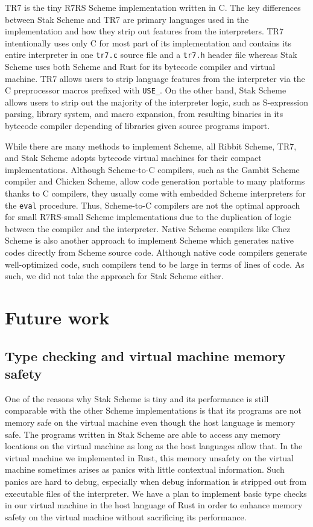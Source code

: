 \documentclass[sigplan, anonymous, review]{acmart}
\begin{document}
TR7 \cite{tr7} is the tiny R7RS Scheme implementation written in C.
The key differences between Stak Scheme and TR7 are primary languages used in
the implementation and how they strip out features from the
interpreters.
TR7 intentionally uses only C for most part of its implementation and
contains its entire interpreter in one \texttt{tr7.c} source file and a
\texttt{tr7.h} header file whereas Stak Scheme uses both Scheme and
Rust for its bytecode compiler and virtual machine.
TR7 allows users to strip language features from the interpreter via
the C preprocessor macros prefixed with \texttt{USE\_}.
On the other hand, Stak Scheme allows users to strip out the majority of
the interpreter logic, such as S-expression parsing, library system, and
macro expansion, from resulting binaries in its bytecode compiler
depending of libraries given source programs import.

While there are many methods to implement Scheme, all Ribbit Scheme,
TR7, and Stak Scheme adopts bytecode virtual machines for their
compact implementations.
Although Scheme-to-C compilers, such as the Gambit Scheme compiler and
Chicken Scheme, allow code generation portable to many platforms
thanks to C compilers, they usually come with embedded Scheme
interpreters for the \texttt{eval} procedure.
Thus, Scheme-to-C compilers are not the optimal approach for small
R7RS-small Scheme implementations due to the duplication of logic between the
compiler and the interpreter.
Native Scheme compilers like Chez Scheme is also another approach to
implement Scheme which generates native codes directly from Scheme source code.
Although native code compilers generate well-optimized code, such
compilers tend to be large in terms of lines of code.
As such, we did not take the approach for Stak Scheme either.

\section{Future work}

\subsection{Type checking and virtual machine memory safety}

One of the reasons why Stak Scheme is tiny and its performance is still
comparable with the other Scheme implementations is that its
programs are not memory safe on the virtual machine even though
the host language is memory safe.
The programs written in Stak Scheme are able to access any memory
locations on the virtual machine as long as the host languages allow that.
In the virtual machine we implemented in Rust, this memory
unsafety on the virtual machine sometimes arises as panics with little
contextual information.
Such panics are hard to debug, especially when debug information is
stripped out from executable files of the interpreter.
We have a plan to implement basic type checks in our virtual machine
in the host language of Rust in order to enhance memory safety on
the virtual machine without sacrificing its performance.
\end{document}
